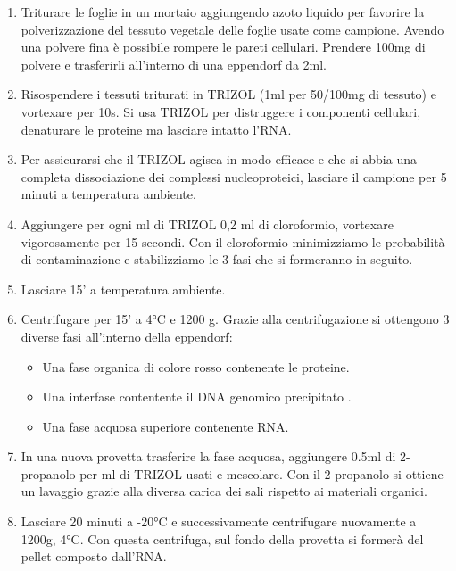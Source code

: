\begin{enumerate}
\item Triturare le foglie in un mortaio aggiungendo azoto liquido per favorire
la polverizzazione del tessuto vegetale delle foglie usate come campione.
Avendo una polvere fina \`e possibile rompere le pareti cellulari.
Prendere 100mg di polvere e trasferirli all’interno di una eppendorf da 2ml.

\item Risospendere i tessuti triturati in TRIZOL (1ml per 50/100mg di tessuto)
e vortexare per 10s.
Si usa TRIZOL per distruggere i componenti cellulari, denaturare le proteine ma lasciare intatto l’RNA.

\item Per assicurarsi che il TRIZOL agisca in modo efficace e che si abbia una completa
dissociazione dei complessi nucleoproteici, lasciare il campione per 5 minuti a
temperatura ambiente.

\item Aggiungere per ogni ml di TRIZOL 0,2 ml di cloroformio,
vortexare vigorosamente per 15 secondi.
Con il cloroformio minimizziamo le probabilità di contaminazione e stabilizziamo
le 3 fasi che si formeranno in seguito.

\item Lasciare 15’ a temperatura ambiente.

\item Centrifugare per 15’ a 4°C e 1200 g. Grazie alla centrifugazione si ottengono
3 diverse fasi all’interno della eppendorf:
	\begin{itemize}
	\item Una fase organica di colore rosso contenente le proteine.
	\item Una interfase contentente il DNA genomico precipitato	.
	\item Una fase acquosa superiore contenente RNA.
	\end{itemize}

\item In una nuova provetta trasferire la fase acquosa, aggiungere 0.5ml di 2-propanolo
per ml di TRIZOL usati e mescolare. Con il 2-propanolo si ottiene un lavaggio grazie
alla diversa carica dei sali rispetto ai materiali organici.

\item Lasciare 20 minuti a -20°C e successivamente centrifugare nuovamente a 1200g, 4°C.
Con questa centrifuga, sul fondo della provetta si formerà del pellet composto dall’RNA.


\end{enumerate}
